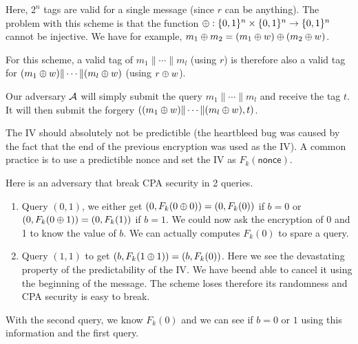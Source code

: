\newape

\begin{solution}
  Here, $2^n$ tags are valid for a single message (since $r$ can be anything).
  The problem with this scheme is that the function $\oplus: \{0,1\}^n \times \{0,1\}^n \to \{0,1\}^n$
  cannot be injective.
  We have for example, $m_1 \oplus m_2 = (m_1 \oplus w) \oplus (m_2 \oplus w)$.

  For this scheme, a valid tag of $m_1 \| \cdots \| m_l$ (using $r$)
  is therefore also a valid tag for $(m_1 \oplus w) \| \cdots \| (m_l \oplus w)$ (using $r \oplus w$).

  Our adversary $\mathcal{A}$ will simply submit the query $m_1 \| \cdots \| m_l$ and receive the tag $t$.
  It will then submit the forgery $((m_1 \oplus w) \| \cdots \| (m_l \oplus w), t)$.
\end{solution}

\begin{solution}
  The IV should absolutely not be predictible (the heartbleed bug was caused by the fact that the end of the previous encryption was used as the IV).
  A common practice is to use a predictible nonce and set the IV as $F_k(\mathsf{nonce})$.

  Here is an adversary that break CPA security in 2 queries.
  \begin{enumerate}
    \item Query $(0,1)$, we either get $(0,F_k(0 \oplus 0)) = (0,F_k(0))$ if $b = 0$ or $(0,F_k(0 \oplus 1)) = (0,F_k(1))$ if $b = 1$.
      We could now ask the encryption of 0 and 1 to know the value of $b$.
      We can actually computes $F_k(0)$ to spare a query.
    \item Query $(1,1)$ to get $(b, F_k(1 \oplus 1)) = (b, F_k(0))$.
      Here we see the devastating property of the predictability of the IV.
      We have beend able to cancel it using the beginning of the message.
      The scheme loses therefore its randomness and CPA security is easy to break.
  \end{enumerate}
  With the second query, we know $F_k(0)$ and we can see if $b = 0$ or $1$ using this information and the first query.
\end{solution}

